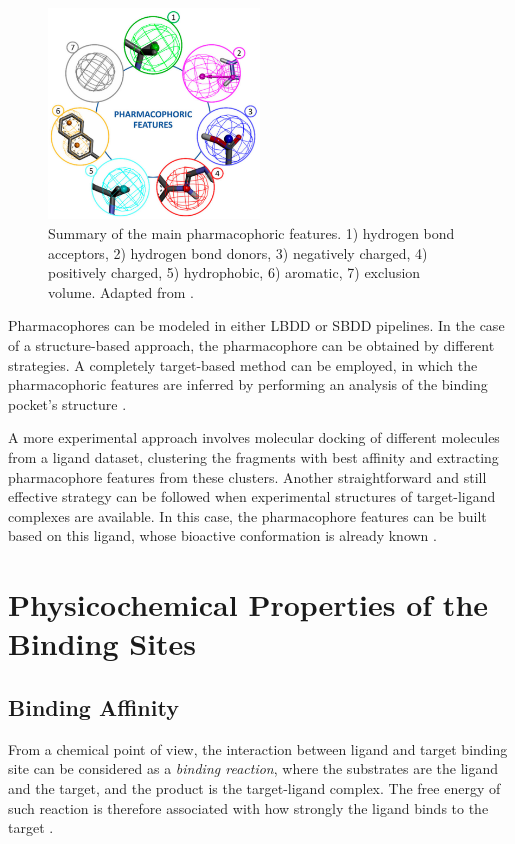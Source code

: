     \begin{figure}[H]
      \centering
      \includegraphics[width=0.5\textwidth]{figures/intro/pharmacophores.jpg}
      \caption{\label{fig:intro/pharmacophores} Summary of the main pharmacophoric features. 1) hydrogen bond acceptors, 2) hydrogen bond donors, 3) negatively charged, 4) positively charged, 5) hydrophobic, 6) aromatic, 7) exclusion volume. Adapted from \cite{pharmacophore_and_VS_2022}.}
    \end{figure}

    Pharmacophores can be modeled in either LBDD or SBDD pipelines. In the case of a structure-based approach, the pharmacophore can be obtained by different strategies. A completely target-based method can be employed, in which the pharmacophoric features are inferred by performing an analysis of the binding pocket's structure \cite{pharmacophore_and_VS_2022, virtual_screening_2019}.

    A more experimental approach involves molecular docking of different molecules from a ligand dataset, clustering the fragments with best affinity and extracting pharmacophore features from these clusters. Another straightforward and still effective strategy can be followed when experimental structures of target-ligand complexes are available. In this case, the pharmacophore features can be built based on this ligand, whose bioactive conformation is already known \cite{virtual_screening_2019}.


\section{Physicochemical Properties of the Binding Sites}
  \subsection{Binding Affinity}
    From a chemical point of view, the interaction between ligand and target binding site can be considered as a \textit{binding reaction}, where the substrates are the ligand and the target, and the product is the target-ligand complex. The free energy of such reaction is therefore associated with how strongly the ligand binds to the target \cite{binding_affinity_2016, binding_affinity_web}.

